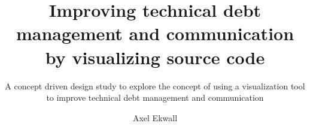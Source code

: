 \documentclass[sigplan, nonacm, balance=false, authorversion=true]{acmart}
\begin{document}
\title{Improving technical debt management and communication by visualizing source code}
\subtitle{A concept driven design study to explore the concept of using a visualization tool to improve technical debt management and communication}
\author{Axel Ekwall}





\maketitle














\appendix
\end{document}
